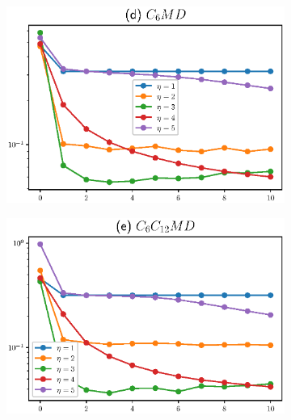\begin{figure}[!p]
\begin{center}
\begin{subfigure}{.5\textwidth}
		\end{subfigure}\hfill%
		\begin{subfigure}{.5\textwidth}
			\centering
			\includegraphics[width=0.95\linewidth]{figuras/C5o6RMchD.eps}
		\end{subfigure}\hfill%
		\newline\hspace*{-0.2cm}\hspace*{0.2cm}%
		\begin{subfigure}{.5\textwidth}
			\centering
			\includegraphics[width=0.95\linewidth]{figuras/C5o6C5o12RMchD.eps}
		\end{subfigure}\hfill%
		\begin{subfigure}{.5\textwidth}

\end{subfigure}
\end{center}
\end{figure}

